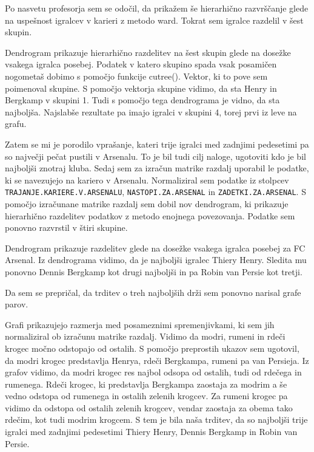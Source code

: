 \documentclass[11pt,a4paper]{article}
\begin{document}
\newpage
Po nasvetu profesorja sem se odočil, da prikažem še hierarhično razvrščanje glede na uspešnost igralcev v karieri z metodo ward. Tokrat sem igralce razdelil v šest skupin. 


Dendrogram prikazuje hierarhično razdelitev na šest skupin glede na dosežke vsakega igralca posebej. Podatek v katero skupino spada vsak posamičen nogometaš dobimo s pomočjo funkcije cutree(). Vektor, ki to pove sem poimenoval skupine. S pomočjo vektorja skupine vidimo, da sta Henry in Bergkamp v skupini 1. Tudi s pomočjo tega dendrograma je vidno, da sta najboljša. Najslabše rezultate pa imajo igralci v skupini 4, torej prvi iz leve na grafu.

\newpage
Zatem se mi je porodilo vprašanje, kateri trije igralci med zadnjimi pedesetimi pa so največji pečat pustili v Arsenalu. To je bil tudi cilj naloge, ugotoviti kdo je bil najboljši znotraj kluba. Sedaj sem za izračun matrike razdalj uporabil le podatke, ki se navezujejo na kariero v Arsenalu. Normaliziral sem podatke iz stolpcev \verb|TRAJANJE.KARIERE.V.ARSENALU|, \verb|NASTOPI.ZA.ARSENAL| in \verb|ZADETKI.ZA.ARSENAL|. S pomočjo izračunane matrike razdalj sem dobil nov dendrogram, ki prikazuje hierarhično razdelitev podatkov z metodo enojnega povezovanja. Podatke sem ponovno razvrstil v štiri skupine.


Dendrogram prikazuje razdelitev glede na dosežke vsakega igralca posebej za FC Arsenal. Iz dendrograma vidimo, da je najboljši igralec Thiery Henry. Sledita mu ponovno Dennis Bergkamp kot drugi najboljši in pa Robin van Persie kot tretji.

\newpage
Da sem se prepričal, da trditev o treh najboljših drži sem ponovno narisal grafe parov.


Grafi prikazujejo razmerja med posameznimi spremenjivkami, ki sem jih normaliziral ob izračunu matrike razdalj. Vidimo da modri, rumeni in rdeči krogec močno odstopajo od ostalih. S pomočjo preprostih ukazov sem ugotovil, da modri krogec predstavlja Henrya, rdeči Bergkampa, rumeni pa van Persieja. Iz grafov vidimo, da modri krogec res najbol odsopa od ostalih, tudi od rdečega in rumenega. Rdeči krogec, ki predstavlja  Bergkampa zaostaja za modrim a še vedno odstopa od rumenega in ostalih zelenih krogcev. Za rumeni krogec pa vidimo da odstopa od ostalih zelenih krogcev, vendar zaostaja za obema tako rdečim, kot tudi modrim krogcem. S tem je bila naša trditev, da so najboljši trije igralci med zadnjimi pedesetimi Thiery Henry, Dennis Bergkamp in Robin van Persie.
\end{document}
